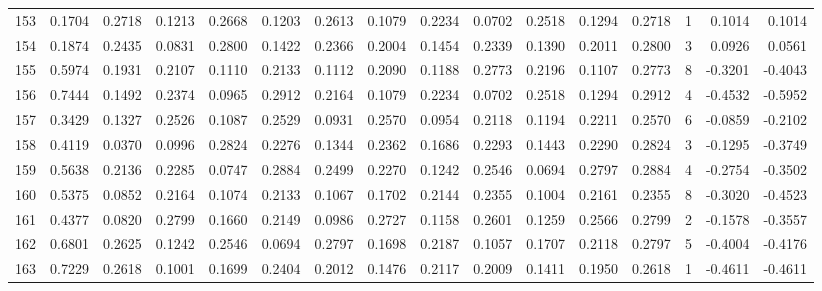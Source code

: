 \begin{tabular}{lrrrrrrrrrrrrrrr}
153 &      0.1704 &  0.2718 &  0.1213 &  0.2668 &  0.1203 &  0.2613 &  0.1079 &  0.2234 &  0.0702 &  0.2518 &   0.1294 &     0.2718 &      1 &                    0.1014 &                     0.1014 \\
154 &      0.1874 &  0.2435 &  0.0831 &  0.2800 &  0.1422 &  0.2366 &  0.2004 &  0.1454 &  0.2339 &  0.1390 &   0.2011 &     0.2800 &      3 &                    0.0926 &                     0.0561 \\
155 &      0.5974 &  0.1931 &  0.2107 &  0.1110 &  0.2133 &  0.1112 &  0.2090 &  0.1188 &  0.2773 &  0.2196 &   0.1107 &     0.2773 &      8 &                   -0.3201 &                    -0.4043 \\
156 &      0.7444 &  0.1492 &  0.2374 &  0.0965 &  0.2912 &  0.2164 &  0.1079 &  0.2234 &  0.0702 &  0.2518 &   0.1294 &     0.2912 &      4 &                   -0.4532 &                    -0.5952 \\
157 &      0.3429 &  0.1327 &  0.2526 &  0.1087 &  0.2529 &  0.0931 &  0.2570 &  0.0954 &  0.2118 &  0.1194 &   0.2211 &     0.2570 &      6 &                   -0.0859 &                    -0.2102 \\
158 &      0.4119 &  0.0370 &  0.0996 &  0.2824 &  0.2276 &  0.1344 &  0.2362 &  0.1686 &  0.2293 &  0.1443 &   0.2290 &     0.2824 &      3 &                   -0.1295 &                    -0.3749 \\
159 &      0.5638 &  0.2136 &  0.2285 &  0.0747 &  0.2884 &  0.2499 &  0.2270 &  0.1242 &  0.2546 &  0.0694 &   0.2797 &     0.2884 &      4 &                   -0.2754 &                    -0.3502 \\
160 &      0.5375 &  0.0852 &  0.2164 &  0.1074 &  0.2133 &  0.1067 &  0.1702 &  0.2144 &  0.2355 &  0.1004 &   0.2161 &     0.2355 &      8 &                   -0.3020 &                    -0.4523 \\
161 &      0.4377 &  0.0820 &  0.2799 &  0.1660 &  0.2149 &  0.0986 &  0.2727 &  0.1158 &  0.2601 &  0.1259 &   0.2566 &     0.2799 &      2 &                   -0.1578 &                    -0.3557 \\
162 &      0.6801 &  0.2625 &  0.1242 &  0.2546 &  0.0694 &  0.2797 &  0.1698 &  0.2187 &  0.1057 &  0.1707 &   0.2118 &     0.2797 &      5 &                   -0.4004 &                    -0.4176 \\
163 &      0.7229 &  0.2618 &  0.1001 &  0.1699 &  0.2404 &  0.2012 &  0.1476 &  0.2117 &  0.2009 &  0.1411 &   0.1950 &     0.2618 &      1 &                   -0.4611 &                    -0.4611 \\

\end{tabular}
